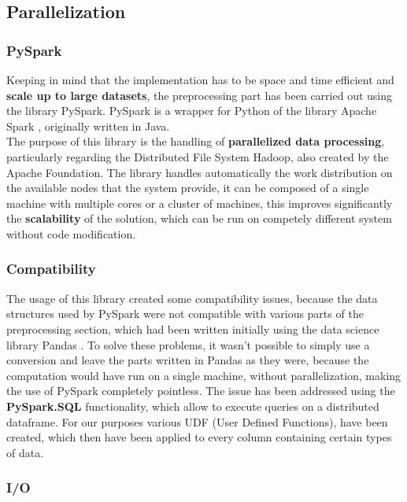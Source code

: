 \documentclass[
	letterpaper, %
	10pt, %
]{class}
\begin{document}
\subsection{Parallelization}

\subsubsection{PySpark}
Keeping in mind that the implementation has to be space and time efficient and \textbf{scale up to large datasets}, the preprocessing part has been carried out using the library PySpark.
PySpark is a wrapper for Python of the library Apache Spark \cite{spark}, originally written in Java.\\

The purpose of this library is the handling of \textbf{parallelized data processing}, particularly regarding the Distributed File System Hadoop, also created by the Apache Foundation.
The library handles automatically the work distribution on the available nodes that the system provide, it can be composed of a single machine with multiple cores or a cluster of machines, this improves significantly the \textbf{scalability} of the solution, which can be run on competely different system without code modification.\\

\subsubsection{Compatibility}

The usage of this library created some compatibility issues, because the data structures used by PySpark were not compatible with various parts of the preprocessing section, which had been written initially using the data science library Pandas \cite{pandas}.
To solve these problems, it wasn't possible to simply use a conversion and leave the parts written in Pandas as they were, because the computation would have run on a single machine, without parallelization, making the use of PySpark completely pointless.
The issue has been addressed using the \textbf{PySpark.SQL} functionality, which allow to execute queries on a distributed dataframe. For our purposes various UDF (User Defined Functions), have been created, which then have been applied to every column containing certain types of data.\\

\subsubsection{I/O}
\end{document}
